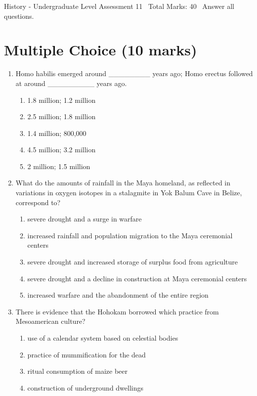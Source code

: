 \documentclass[12pt]{article}
\begin{document}
\begin{center}
History - Undergraduate Level Assessment 11 \
Total Marks: 40 \
Answer all questions.
\end{center}

\section*{Multiple Choice (10 marks)}
\begin{enumerate}[label=\arabic*.]
\item Homo habilis emerged around \_\_\_\_\_\_\_\_ years ago; Homo erectus followed at around \_\_\_\_\_\_\_\_\_ years ago.
\begin{enumerate}[label=(\alph*)]
    \item 1.8 million; 1.2 million
    \item 2.5 million; 1.8 million
    \item 1.4 million; 800,000
    \item 4.5 million; 3.2 million
    \item 2 million; 1.5 million
\end{enumerate}
\item What do the amounts of rainfall in the Maya homeland, as reflected in variations in oxygen isotopes in a stalagmite in Yok Balum Cave in Belize, correspond to?
\begin{enumerate}[label=(\alph*)]
    \item severe drought and a surge in warfare
    \item increased rainfall and population migration to the Maya ceremonial centers
    \item severe drought and increased storage of surplus food from agriculture
    \item severe drought and a decline in construction at Maya ceremonial centers
    \item increased warfare and the abandonment of the entire region
\end{enumerate}
\item There is evidence that the Hohokam borrowed which practice from Mesoamerican culture?
\begin{enumerate}[label=(\alph*)]
    \item use of a calendar system based on celestial bodies
    \item practice of mummification for the dead
    \item ritual consumption of maize beer
    \item construction of underground dwellings

\end{enumerate}
\end{enumerate}
\end{document}
